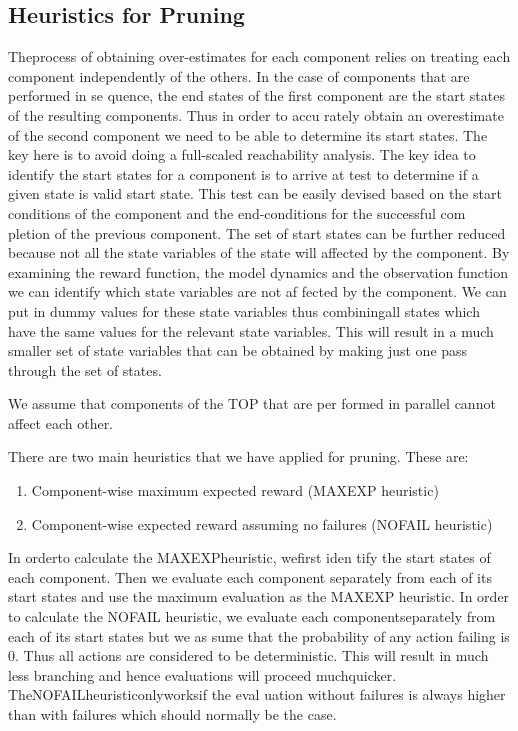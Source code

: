 \documentclass{IEEEtran}
\begin{document}
\subsection{\textbf{Heuristics for Pruning}}
Theprocess of obtaining over-estimates for each component
 relies on treating each component independently of the others. In the case of components that are performed in se
quence, the end states of the first component are the start
 states of the resulting components. Thus in order to accu
rately obtain an overestimate of the second component we
 need to be able to determine its start states. The key here is
 to avoid doing a full-scaled reachability analysis. The key
 idea to identify the start states for a component is to arrive at
 test to determine if a given state is valid start state. This test
 can be easily devised based on the start conditions of the
 component and the end-conditions for the successful com
pletion of the previous component. The set of start states
 can be further reduced because not all the state variables of
 the state will affected by the component. By examining the
 reward function, the model dynamics and the observation
 function we can identify which state variables are not af
fected by the component. We can put in dummy values for
 these state variables thus combiningall states which have the
 same values for the relevant state variables. This will result
 in a much smaller set of state variables that can be obtained
 by making just one pass through the set of states.

  We assume that components of the TOP that are per
formed in parallel cannot affect each other.

There are two main heuristics that we have applied for
 pruning. These are:
 \begin{enumerate}
     \item Component-wise maximum expected reward (MAXEXP heuristic)
     \item Component-wise expected reward assuming no failures
 (NOFAIL heuristic)
 \end{enumerate}

  In orderto calculate the MAXEXPheuristic, wefirst iden
tify the start states of each component. Then we evaluate
 each component separately from each of its start states and
 use the maximum evaluation as the MAXEXP heuristic. In
 order to calculate the NOFAIL heuristic, we evaluate each
 componentseparately from each of its start states but we as
sume that the probability of any action failing is 0. Thus all
 actions are considered to be deterministic. This will result
 in much less branching and hence evaluations will proceed
 muchquicker. TheNOFAILheuristiconlyworksif the eval
uation without failures is always higher than with failures
 which should normally be the case.
\end{document}
